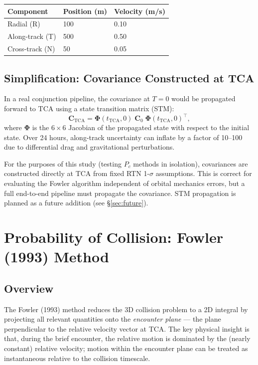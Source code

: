 \documentclass[11pt]{article}
\begin{document}
\begin{center}
\begin{tabular}{lll}
  \toprule
  Component & Position (m) & Velocity (m/s) \\
  \midrule
  Radial (R) & 100 & 0.10 \\
  Along-track (T) & 500 & 0.50 \\
  Cross-track (N) & 50 & 0.05 \\
  \bottomrule
\end{tabular}
\end{center}

\subsection{Simplification: Covariance Constructed at TCA}

In a real conjunction pipeline, the covariance at $T{=}0$ would be propagated
forward to TCA using a state transition matrix (STM):
\begin{equation}
  \mathbf{C}_\text{TCA} = \boldsymbol{\Phi}(t_\text{TCA}, 0)\;\mathbf{C}_0\;
  \boldsymbol{\Phi}(t_\text{TCA}, 0)^\top,
\end{equation}
where $\boldsymbol{\Phi}$ is the $6\times6$ Jacobian of the propagated state
with respect to the initial state.  Over 24 hours, along-track uncertainty can
inflate by a factor of 10--100 due to differential drag and gravitational
perturbations.

For the purposes of this study (testing $P_c$ methods in isolation), covariances
are constructed directly at TCA from fixed RTN 1-$\sigma$ assumptions.  This is
correct for evaluating the Fowler algorithm independent of orbital mechanics
errors, but a full end-to-end pipeline must propagate the covariance.  STM
propagation is planned as a future addition (see \S\ref{sec:future}).

\section{Probability of Collision: Fowler (1993) Method}
\label{sec:fowler}

\subsection{Overview}

The Fowler (1993) method reduces the 3D collision problem to a 2D integral by
projecting all relevant quantities onto the \emph{encounter plane} — the plane
perpendicular to the relative velocity vector at TCA.  The key physical insight
is that, during the brief encounter, the relative motion is dominated by the
(nearly constant) relative velocity; motion within the encounter plane can be
treated as instantaneous relative to the collision timescale.
\end{document}
